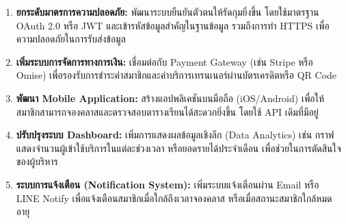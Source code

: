 \begin{enumerate}
    \item \textbf{ยกระดับมาตรการความปลอดภัย:} \newline พัฒนาระบบยืนยันตัวตนให้รัดกุมยิ่งขึ้น โดยใช้มาตรฐาน OAuth 2.0 หรือ JWT และเข้ารหัสข้อมูลสำคัญในฐานข้อมูล รวมถึงการทำ HTTPS เพื่อความปลอดภัยในการรับส่งข้อมูล
    
    \item \textbf{เพิ่มระบบการจัดการทางการเงิน:} \newline เชื่อมต่อกับ Payment Gateway \newline (เช่น Stripe หรือ Omise) เพื่อรองรับการชำระค่าสมาชิกและค่าบริการเทรนเนอร์ผ่านบัตรเครดิตหรือ QR Code
    
    \item \textbf{พัฒนา Mobile Application:} \newline สร้างแอปพลิเคชันบนมือถือ (iOS/Android) เพื่อให้สมาชิกสามารถจองคลาสและตรวจสอบตารางเรียนได้สะดวกยิ่งขึ้น โดยใช้ API เดิมที่มีอยู่
    
    \item \textbf{ปรับปรุงระบบ Dashboard:} \newline เพิ่มการแสดงผลข้อมูลเชิงลึก (Data Analytics) เช่น กราฟแสดงจำนวนผู้เข้าใช้บริการในแต่ละช่วงเวลา หรือยอดรายได้ประจำเดือน เพื่อช่วยในการตัดสินใจของผู้บริหาร
    
    \item \textbf{ระบบการแจ้งเตือน (Notification System):} \newline เพิ่มระบบแจ้งเตือนผ่าน Email หรือ LINE Notify เพื่อแจ้งเตือนสมาชิกเมื่อใกล้ถึงเวลาจองคลาส หรือเมื่อสถานะสมาชิกใกล้หมดอายุ
\end{enumerate}
